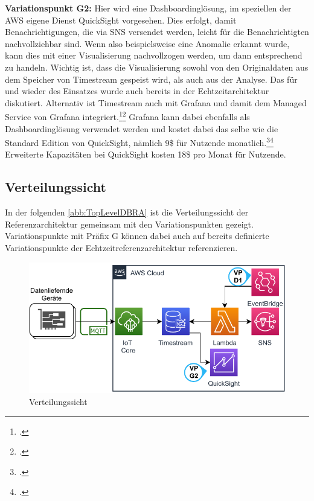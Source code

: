 \textbf{Variationspunkt G2:} Hier wird eine Dashboardinglösung, im speziellen der \ac{AWS} eigene Dienst QuickSight vorgesehen. Dies erfolgt, damit Benachrichtigungen, die via \ac{SNS} versendet werden, leicht für die Benachrichtigten nachvollziehbar sind. Wenn also beispielsweise eine Anomalie erkannt wurde, kann dies mit einer Visualisierung nachvollzogen werden, um dann entsprechend zu handeln. Wichtig ist, dass die Visualisierung sowohl von den Originaldaten aus dem Speicher von Timestream gespeist wird, als auch aus der Analyse. Das für und wieder des Einsatzes wurde auch bereits in  der Echtzeitarchitektur diskutiert. Alternativ ist Timestream auch mit Grafana und damit dem Managed Service von Grafana integriert.\footcite[Vgl.][]{AmazonWebServicesInc..o.J.bm}\nzitat\footcite[Vgl.][]{Dutt.2020} Grafana kann dabei ebenfalls als Dashboardinglösung verwendet werden und kostet dabei das selbe wie die Standard Edition von QuickSight, nämlich 9\$ für Nutzende monatlich.\footcite[Vgl. auch im Foglenden][]{AmazonWebServicesInc..o.J.bn}\nzitat\footcite[Vgl.][]{AmazonWebServicesInc..o.J.bo} Erweiterte Kapazitäten bei QuickSight kosten 18\$ pro Monat für Nutzende. 



\subsection{Verteilungssicht}
In der folgenden \autoref{abb:TopLevelDBRA} ist die Verteilungssicht der Referenzarchitektur gemeinsam mit den Variationspunkten gezeigt. Variationspunkte mit Präfix G können dabei auch auf bereits definierte Variationspunkte der Echtzeitreferenzarchitektur referenzieren.
\begin{figure}[H]
\centering
\includegraphics[width=\textwidth]{graphics/DB-RA-Overview.pdf}
\caption{Verteilungssicht}
\label{abb:TopLevelDBRA}
\end{figure}

